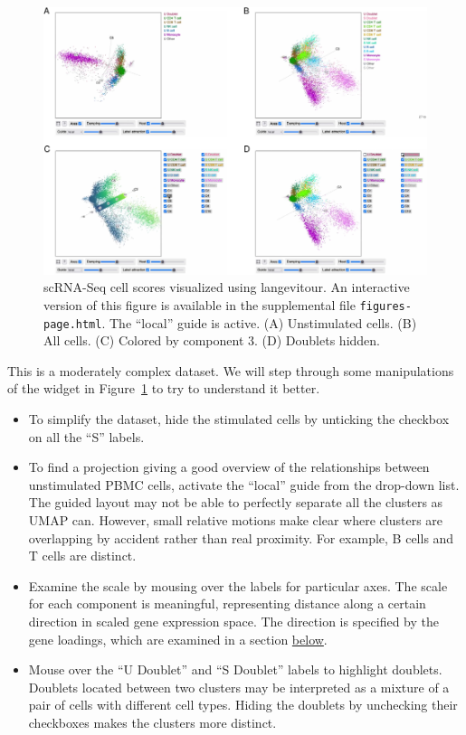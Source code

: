 \begin{figure}
\centering
\includegraphics{langevitour-article_files/figure-latex/raw-1.pdf}
\caption{\label{fig:raw}scRNA-Seq cell scores visualized using langevitour. An interactive version of this figure is available in the supplemental file \texttt{figures-page.html}. The ``local'' guide is active. (A) Unstimulated cells. (B) All cells. (C) Colored by component 3. (D) Doublets hidden.}
\end{figure}

This is a moderately complex dataset. We will step through some manipulations of the widget in Figure~\ref{fig:raw} to try to understand it better.

\begin{itemize}
\item
  To simplify the dataset, hide the stimulated cells by unticking the checkbox on all the ``S'' labels.
\item
  To find a projection giving a good overview of the relationships between unstimulated PBMC cells, activate the ``local'' guide from the drop-down list. The guided layout may not be able to perfectly separate all the clusters as UMAP can. However, small relative motions make clear where clusters are overlapping by accident rather than real proximity. For example, B cells and T cells are distinct.
\item
  Examine the scale by mousing over the labels for particular axes. The scale for each component is meaningful, representing distance along a certain direction in scaled gene expression space. The direction is specified by the gene loadings, which are examined in a section \protect\hyperlink{geneloadings}{below}.
\item
  Mouse over the ``U Doublet'' and ``S Doublet'' labels to highlight doublets. Doublets located between two clusters may be interpreted as a mixture of a pair of cells with different cell types. Hiding the doublets by unchecking their checkboxes makes the clusters more distinct.
\end{itemize}

